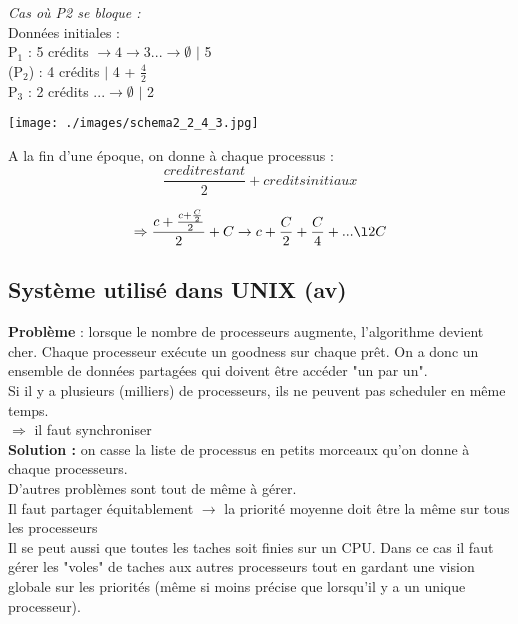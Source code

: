 \documentclass[12pt,a4paper]{report}
\begin{document}
\textit{Cas où P2 se bloque :}\\

Données initiales : \\
P$_1$ : 5 crédits \textbf{$\rightarrow 4 \rightarrow 3 ... \rightarrow \emptyset$} \hspace*{1.05cm} $\mid$ 5\\
(P$_2$) : 4 crédits \hspace*{3.68cm} $\mid$ 4 + $\frac{4}{2}$\\
P$_3$ : 2 crédits \textbf{$... \rightarrow \emptyset$} \hspace*{2.65cm} $\mid$ 2
\begin{center}
\texttt{[image: ./images/schema2\_2\_4\_3.jpg]}
\end{center}


A la fin d'une époque, on donne à chaque processus :\\
$$\frac{credit restant}{2} + credits initiaux $$

 $$\Rightarrow \frac{c +\frac{c + \frac{C}{2}}{2}}{2} + C \rightarrow c + \frac{C}{2} +  \frac{C}{4} + ... \l 2C$$

\subsection{Système utilisé dans UNIX (av)}
\textbf{Problème} : lorsque le nombre de processeurs augmente, l'algorithme devient cher. Chaque processeur exécute un goodness sur chaque prêt. On a donc un ensemble de données partagées qui doivent être accéder "un par un".\\
Si il y a plusieurs (milliers) de processeurs, ils ne peuvent pas scheduler en même temps.\\

$\Rightarrow$ il faut synchroniser\\

\textbf{Solution :} on casse la liste de processus en petits morceaux qu'on donne à chaque processeurs.\\
D'autres problèmes sont tout de même à gérer.\\

Il faut partager équitablement $\rightarrow$ la priorité moyenne doit être la même sur tous les processeurs\\
Il se peut aussi que toutes les taches soit finies sur un CPU. Dans ce cas il faut gérer les "voles" de taches aux autres processeurs tout en gardant une vision globale sur les priorités (même si moins précise que lorsqu'il y a un unique processeur).
\end{document}
